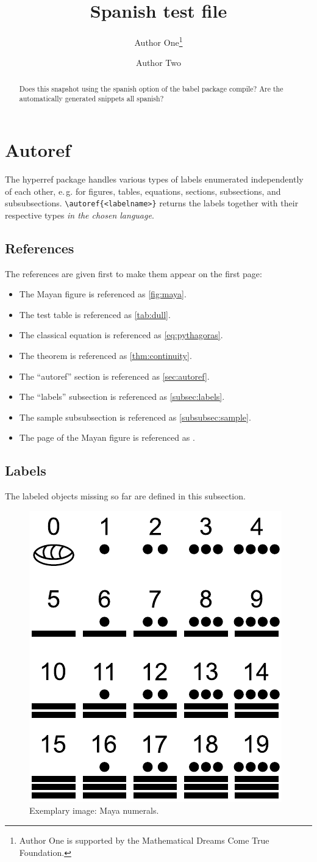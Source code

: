 \documentclass{snapshotmfo}
\author{Author One\thanks{Author One is supported by the Mathematical Dreams Come True Foundation.} \and Author Two}
\title{Spanish test file}
\begin{document}
\begin{abstract}
Does this snapshot using the spanish option of the babel package compile? Are the automatically generated snippets all spanish?
\end{abstract}

\section{Autoref} \label{sec:autoref}
The hyperref package handles various types of labels enumerated independently of each other, e.\,g.
for figures, tables, equations, sections, subsections, and subsubsections.
\verb+\autoref{<labelname>}+ returns the labels together with their respective types {\em in the chosen language}.

\subsection{References}
The references are given first to make them appear on the first page:
\begin{itemize}
\item[] The Mayan figure is referenced as \autoref{fig:maya}.
\item[] The test table is referenced as \autoref{tab:dull}.
\item[] The classical equation is referenced as \autoref{eq:pythagoras}.
\item[] The theorem is referenced as \autoref{thm:continuity}.
\item[] The ``autoref'' section is referenced as \autoref{sec:autoref}.
\item[] The ``labels'' subsection is referenced as \autoref{subsec:labels}.
\item[] The sample subsubsection is referenced as \autoref{subsubsec:sample}.
\item[] The page of the Mayan figure is referenced as .
\end{itemize}

\subsection{Labels} \label{subsec:labels}
The labeled objects missing so far are defined in this subsection.

\begin{figure}[ht]
  \centering 
  \includegraphics[width= 0.33 \textwidth]{maya.pdf}
  \caption{Exemplary image: Maya numerals.}
  \label{fig:maya}
\end{figure}
\end{document}
